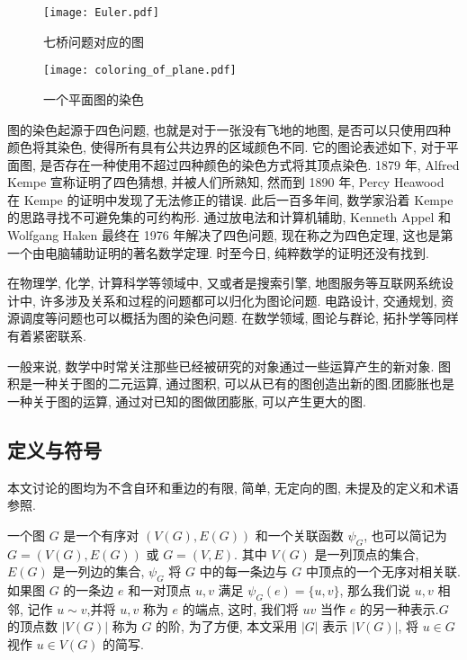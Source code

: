 \documentclass[12pt,a4paper]{article}%
\begin{document}
\begin{figure}[!b]
    \begin{minipage}[b]{0.35\textwidth}
        \centering
        \texttt{[image: Euler.pdf]}
        \caption{七桥问题对应的图}
        \label{EulerGraph}
    \end{minipage}
    \hfill
    \begin{minipage}[b]{0.35\textwidth} 
        \centering
        \texttt{[image: coloring\_of\_plane.pdf]}
        \caption{一个平面图的染色}
        \label{PlaneColoring}
    \end{minipage}
\end{figure}


图的染色起源于四色问题, 也就是对于一张没有飞地的地图, 是否可以只使用四种颜色将其染色, 使得所有具有公共边界的区域颜色不同. 它的图论表述如下, 对于平面图, 是否存在一种使用不超过四种颜色的染色方式将其顶点染色. 1879 年, Alfred Kempe 宣称证明了四色猜想, 并被人们所熟知, 然而到 1890 年, Percy Heawood 在 Kempe 的证明中发现了无法修正的错误. 此后一百多年间, 数学家沿着 Kempe 的思路寻找不可避免集的可约构形. 通过放电法和计算机辅助, Kenneth Appel 和 Wolfgang Haken 最终在 1976 年解决了四色问题, 现在称之为四色定理, 这也是第一个由电脑辅助证明的著名数学定理. 时至今日, 纯粹数学的证明还没有找到.



在物理学, 化学, 计算科学等领域中, 又或者是搜索引擎, 地图服务等互联网系统设计中, 许多涉及关系和过程的问题都可以归化为图论问题. 电路设计, 交通规划, 资源调度等问题也可以概括为图的染色问题\cite{Ju2024}. 在数学领域, 图论与群论, 拓扑学等同样有着紧密联系.

一般来说, 数学中时常关注那些已经被研究的对象通过一些运算产生的新对象. 图积是一种关于图的二元运算, 通过图积, 可以从已有的图创造出新的图.团膨胀也是一种关于图的运算, 通过对已知的图做团膨胀, 可以产生更大的图.

\subsection{定义与符号}
本文讨论的图均为不含自环和重边的有限, 简单, 无定向的图, 未提及的定义和术语参照\cite{bondy2008}.

一个图 $G$ 是一个有序对 $(V(G),E(G))$ 和一个关联函数 $\psi_G$, 也可以简记为 $G = (V(G),E(G))$ 或 $G = (V,E)$. 其中 $V(G)$ 是一列顶点的集合, $E(G)$ 是一列边的集合, $\psi_G$ 将 $G$ 中的每一条边与 $G$ 中顶点的一个无序对相关联. 如果图 $G$ 的一条边 $e$ 和一对顶点 $u,v$ 满足 $\psi_G(e) = \{u,v\}$, 那么我们说 $u,v$ 相邻, 记作 $u \sim v$,并将 $u,v$ 称为 $e$ 的端点, 这时, 我们将 $uv$ 当作 $e$ 的另一种表示.$G$ 的顶点数 $|V(G)|$ 称为 $G$ 的阶, 为了方便, 本文采用 $|G|$ 表示 $|V(G)|$, 将 $u \in G$ 视作 $u \in V(G)$ 的简写.
\end{document}
